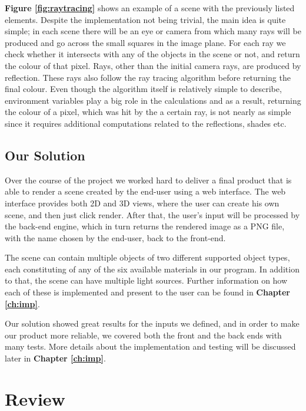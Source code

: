 \documentclass[a4paper]{report}
\begin{document}
	\par \textbf{Figure \ref{fig:raytracing}} shows an example of a scene with the previously listed elements. Despite the implementation not being trivial, the main idea is quite simple; in each scene there will be an eye or camera from which many rays will be produced and go across the small squares in the image plane. For each ray we check whether it intersects with any of the objects in the scene or not, and return the colour of that pixel. Rays, other than the initial camera rays, are produced by reflection. These rays also follow the ray tracing algorithm before returning the final colour. Even though the algorithm itself is relatively simple to describe, environment variables play a big role in the calculations and as a result, returning the colour of a pixel, which was hit by the a certain ray, is not nearly as simple since it requires additional computations related to the reflections, shades etc.
	
	\section{Our Solution}
	Over the course of the project we worked hard to deliver a final product that is able to render a scene created by the end-user using a web interface. The web interface provides both 2D and 3D views, where the user can create his own scene, and then just click render. After that, the user's input will be processed by the back-end engine, which in turn returns the rendered image as a PNG file, with the name chosen by the end-user, back to the front-end.\newline  
	
	\par The scene can contain multiple objects of two different supported object types, each constituting of any of the six available materials in our program. In addition to that, the scene can have multiple light sources. Further information on how each of these is implemented and present to the user can be found in \textbf{Chapter \ref{ch:imp}}.\newline
	
	\par Our solution showed great results for the inputs we defined, and in order to make our product more reliable, we covered both the front and the back ends with many tests. More details about the implementation and testing will be discussed later in \textbf{Chapter \ref{ch:imp}}.
	
	\chapter{Review}
\end{document}
